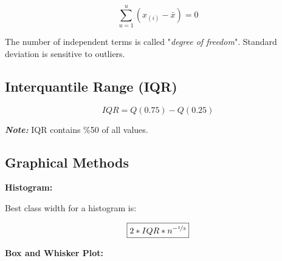 $$\sum_{u=1}^{u}(x_{(i)} - \bar{x}) = 0 $$

The number of independent terms is called "\textit{degree of freedom}". Standard deviation is sensitive to outliers.

\subsection*{Interquantile Range (IQR)}

$$IQR = Q(0.75) - Q(0.25)$$

\textbf{\textit{Note:}} IQR contains \%50 of all values.

\subsection*{Graphical Methods}

\textbf{Histogram:}

\begin{center}
\end{center}

Best class width for a histogram is:

$$\boxed{2*IQR*n^{-\nicefrac{1}{3}}}$$

\textbf{Box and Whisker Plot:}


